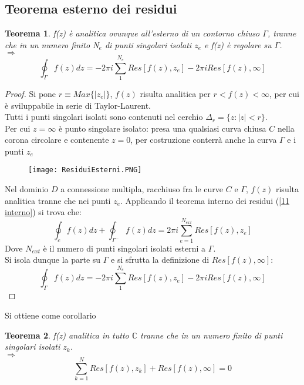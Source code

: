 \documentclass[twoside]{article}
\newtheorem{theorem}{Teorema}[section]
\begin{document}
\subsection{Teorema esterno dei residui}
\begin{theorem}
 f(z) è analitica ovunque all'esterno di un contorno chiuso $\Gamma$, tranne che in un numero finito N$_e$ di punti singolari isolati $z_e$ e f(z) è regolare su $\Gamma$.\\
 $\Longrightarrow$
 \begin{equation}
     \oint_\Gamma f(z)dz=-2\pi i \sum_1^{N_e}Res[f(z),z_e]-2\pi i Res[f(z),\infty]
 \end{equation}
\end{theorem}
\begin{proof}
Si pone $r\equiv Max\{|z_e|\}$, $f(z)$ risulta analitica per $r<f(z)<\infty$, per cui è sviluppabile in serie di Taylor-Laurent.\\
Tutti i punti singolari isolati sono contenuti nel cerchio $\Delta_r=\{ z:|z|<r \}$.
\\
Per cui $z=\infty$ è punto singolare isolato: presa una qualsiasi curva chiusa $C$ nella corona circolare e contenente $z=0$, per costruzione conterrà anche la curva $\Gamma$ e i punti $z_e$
\begin{figure}[h]
    \centering
    \texttt{[image: ResiduiEsterni.PNG]}
\end{figure}
Nel dominio $D$ a connessione multipla, racchiuso fra le curve $C$ e $\Gamma$, $f(z)$ risulta analitica tranne che nei punti $z_e$. Applicando il teorema interno dei residui (\ref{11 interno}) si trova che:
\begin{equation}
    \oint_c f(z)dz+\oint_{\Gamma^-}f(z)dz=2\pi i \sum_{e=1}^{N_{ext}}Res[f(z),z_e]
\end{equation}
Dove $N_{ext}$ è il numero di punti singolari isolati esterni a $\Gamma$.\\
Si isola dunque la parte su $\Gamma$ e si sfrutta la definizione di $Res[f(z),\infty]$:
\begin{equation}
     \oint_\Gamma f(z)dz=-2\pi i \sum_1^{N_e}Res[f(z),z_e]-2\pi i Res[f(z),\infty]
 \end{equation}
\end{proof}
Si ottiene come corollario \begin{theorem}
 f(z) analitica in tutto $\mathds{C}$ tranne che in un numero finito di punti singolari isolati $z_k$.\\
 $\Longrightarrow$
 \begin{equation}
     \sum_{k=1}^N Res[f(z),z_k]+Res[f(z),\infty]=0
 \end{equation}
\end{theorem}
\end{document}
